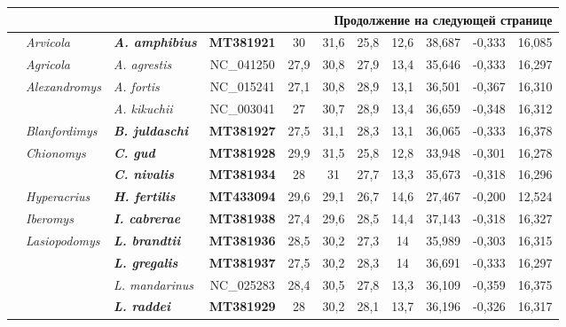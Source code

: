 \begin{landscape}
\begin{longtable}{|l|l|l|c|c|c|c|c|c|c|c|}
\endhead

\hline \multicolumn{11}{|r|}{{Продолжение на следующей странице}} \\ \hline
\endfoot

\hline \hline
\endlastfoot
				
				
				\multirow{29}{*}{Arvicolini} & \textit{Arvicola} & \textit{\textbf{A. amphibius}} & \textbf{MT381921} & 30 & 31,6 & 25,8 & 12,6 & 38,687 & -0,333 & 16,085 \\ \cline{2-11} 
				& \textit{Agricola} & \textit{A. agrestis} & NC\_041250 & 27,9 & 30,8 & 27,9 & 13,4 & 35,646 & -0,333 & 16,297 \\ \cline{2-11} 
				& \multirow{2}{*}{\textit{Alexandromys}} & \textit{A. fortis} & NC\_015241 & 27,1 & 30,8 & 28,9 & 13,1 & 36,501 & -0,367 & 16,310 \\ \cline{3-11} 
				&  & \textit{A. kikuchii} & NC\_003041 & 27 & 30,7 & 28,9 & 13,4 & 36,659 & -0,348 & 16,312 \\ \cline{2-11} 
				& \textit{Blanfordimys} & \textit{\textbf{B. juldaschi}} & \textbf{MT381927} & 27,5 & 31,1 & 28,3 & 13,1 & 36,065 & -0,333 & 16,378 \\ \cline{2-11} 
				& \multirow{2}{*}{\textit{Chionomys}} & \textit{\textbf{C. gud}} & \textbf{MT381928} & 29,9 & 31,5 & 25,8 & 12,8 & 33,948 & -0,301 & 16,278 \\ \cline{3-11} 
				&  & \textit{\textbf{C. nivalis}} & \textbf{MT381934} & 28 & 31 & 27,7 & 13,3 & 35,673 & -0,318 & 16,296 \\ \cline{2-11} 
				& \textit{Hyperacrius} & \textit{\textbf{H. fertilis}} & \textbf{MT433094} & 29,6 & 29,1 & 26,7 & 14,6 & 27,467 & -0,200 & 12,524 \\ \cline{2-11} 
				& \textit{Iberomys} & \textit{\textbf{I. cabrerae}} & \textbf{MT381938} & 27,4 & 29,6 & 28,5 & 14,4 & 37,143 & -0,318 & 16,327 \\ \cline{2-11} 
				& \multirow{4}{*}{\textit{Lasiopodomys}} & \textit{\textbf{L. brandtii}} & \textbf{MT381936} & 28,5 & 30,2 & 27,3 & 14 & 35,989 & -0,303 & 16,315 \\ \cline{3-11} 
				&  & \textit{\textbf{L. gregalis}} & \textbf{MT381937} & 27,5 & 30,2 & 28,3 & 14 & 36,691 & -0,333 & 16,297 \\ \cline{3-11} 
				&  & \textit{L. mandarinus} & NC\_025283 & 28,4 & 30,5 & 27,8 & 13,3 & 36,109 & -0,359 & 16,375 \\ \cline{3-11} 
				&  & \textit{\textbf{L. raddei}} & \textbf{MT381929} & 28 & 30,2 & 28,1 & 13,7 & 36,196 & -0,326 & 16,317 \\ \cline{2-11} 

\end{longtable}
\end{landscape}
